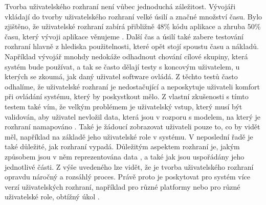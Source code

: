 Tvorba uživatelského rozhraní není vůbec jednoduchá záležitost. Vývojáři vkládají do tvorby uživatelského rozhraní velké úsilí a značné množství času. Bylo zjištěno, že uživatelské rozhraní zabírá přibližně 48\% kódu aplikace a zhruba 50\% času, který vývoji aplikace věnujeme \cite{towards-smart-design}. Další čas a úsilí také zabere testování rozhraní hlavně z hlediska použitelnosti, které opět stojí spoustu času a nákladů. Například vývojář mnohdy nedokáže odhadnout chování cílové skupiny, která systém bude používat, a tak se často dělají testy s koncovým uživatelem, u kterých se zkoumá, jak daný uživatel software ovládá. Z těchto testů často odhalíme, že uživatelské rozhraní je nedostačující a neposkytuje uživateli komfort při ovládání systému, který by poskystkout mělo. Z vlastní zkušenosti s tímto testem také vím, že velkým problémem je uživatelský vstup, který musí být validován, aby uživatel nevložil data, která jsou v rozporu s modelem, na který je rozhraní namapováno \cite{cernyTEA}. Také je žádoucí zobrazovat uživateli pouze to, co by vidět měl, například na základě jeho uživatelské role v systému. V neposlední řadě je také důležité, jak rozhraní vypadá. Důležitým aspektem rozhraní je, jakým způsobem jsou v něm reprezentována data , a také jak jsou uspořádány jeho jednotlivé části. Z výše uvedeného lze vidět, že je tvorba uživatelského rozhraní opravdu náročný a rozsáhlý proces. Právě proto je poskytovat pro systém více verzí uživatelských rozhraní, například pro různé platformy nebo pro různé uživatelské role, obtížný úkol \cite{cernyTEA}.


